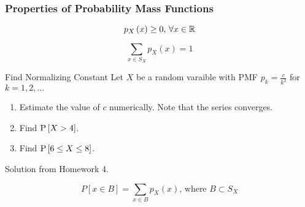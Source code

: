 		\subsubsection{Properties of Probability Mass Functions} \label{subsubsec:Properties of Probability Mass Functions}
			\begin{propertylist}%
				\item
					\begin{equation}
						p_{X} \left( x \right) \geq 0 \text{, } \forall x \in \operatorname{\mathbb{R}}
					\end{equation}
				\item
					\begin{equation}
						\sum\limits_{x \in S_{X}} p_{X} \left( x \right) = 1
					\end{equation}
			\end{propertylist}
					\begin{example}[Problem 3.13]{Find Normalizing Constant}
					Let $X$ be a random varaible with PMF $p_{k} = \frac{c}{k^{2}}$ for $k = 1,2,\ldots$
						\begin{enumerate}[label=\textbf{(\alph*)}]
							\item Estimate the value of $c$ numerically. Note that the series converges.
							\item Find $\operatorname{\operatorname{P}} \left[ X > 4 \right]$.
							\item Find $\operatorname{\operatorname{P}} \left[ 6 \leq X \leq 8 \right]$.
						\end{enumerate}
					
					\tcblower
					
						Solution from Homework 4.
					\end{example}
			\begin{propertylist}[resume]
				\item
					\begin{equation}
						P \left[ x \in B \right] = \sum\limits_{x \in B} p_{X} \left( x \right) \text{, where } B \subset S_{X}
					\end{equation}
			\end{propertylist}
		
